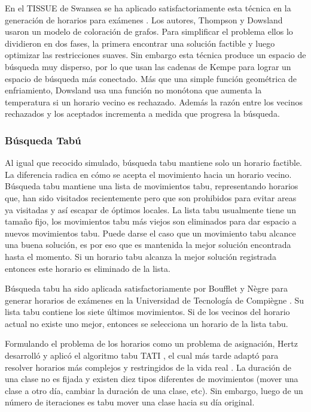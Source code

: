 En el TISSUE de Swansea se ha aplicado satisfactoriamente esta t\'ecnica en la generación de horarios para exámenes
\cite{J Thompson and KA Dowsland, J Thompson and KA Dowsland 2}. Los autores, Thompson y Dowsland usaron un modelo de coloración de grafos. Para simplificar el problema ellos lo dividieron en dos fases, la primera encontrar una solución factible y luego optimizar las restricciones suaves. Sin embargo esta t\'ecnica produce un espacio de búsqueda muy disperso, por lo que usan las cadenas de Kempe para lograr un espacio de búsqueda más conectado. Más que una simple función geom\'etrica de enfriamiento, Dowsland usa una función no monótona que aumenta la temperatura si un horario vecino es rechazado. Además la razón entre los vecinos rechazados y los aceptados incrementa a medida que progresa la búsqueda.

\subsubsection{Búsqueda Tab\'u}

Al igual que recocido simulado, búsqueda tabu mantiene solo un horario factible. La diferencia radica en cómo se acepta el movimiento hacia un horario vecino. Búsqueda tabu mantiene una lista de movimientos tabu, representando horarios que, han sido visitados recientemente pero que son prohibidos para evitar areas ya visitadas y así escapar de óptimos locales. La lista tabu usualmente tiene un tamaño fijo, los movimientos tabu más viejos son eliminados para dar espacio a nuevos movimientos tabu. Puede darse el caso que un movimiento tabu alcance una buena solución, es por eso que es mantenida la mejor solución encontrada hasta el momento. Si un horario tabu alcanza la mejor solución registrada entonces este horario es eliminado de la lista.

Búsqueda tabu ha sido aplicada satisfactoriamente por Boufflet y N\`egre para generar horarios de exámenes en la Universidad de Tecnología de Compi\`egne \cite{JP Boufflet and S Negre}. Su lista tabu contiene los siete últimos movimientos. Si de los vecinos del horario actual no existe uno mejor, entonces se selecciona un horario de la lista tabu.

Formulando el problema de los horarios como un problema de asignación, Hertz desarrolló y aplicó el algoritmo tabu TATI \cite{A Hertz}, el cual más tarde adaptó para resolver horarios más complejos y restringidos de la vida real \cite{A Hertz 2}. La duración de una clase no es fijada y existen diez tipos diferentes de movimientos (mover una clase a otro día, cambiar la duración de una clase, etc). Sin embargo, luego de un número de iteraciones es tabu mover una clase hacia su día original.


